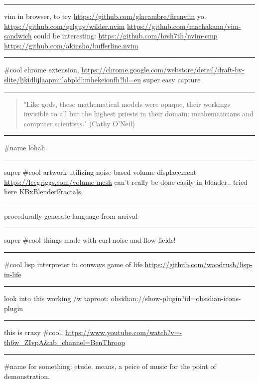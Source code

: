 \documentclass[letterpaper]{article}
\begin{document}
\noindent\rule{\textwidth}{0.5pt}

vim in browser, to try \url{https://github.com/glacambre/firenvim} yo.
\url{https://github.com/gelguy/wilder.nvim}
\url{https://github.com/machakann/vim-sandwich} could be interesting:
\url{https://github.com/hrsh7th/nvim-cmp}
\url{https://github.com/akinsho/bufferline.nvim}

\noindent\rule{\textwidth}{0.5pt}

\#cool chrome extension,
\url{https://chrome.google.com/webstore/detail/draft-by-slite/ljkidlijlaapmiilabpldhmhekeionfh?hl=en}
super easy capture

\noindent\rule{\textwidth}{0.5pt}

\begin{quote}
"Like gods, these mathematical models were opaque, their workings
invisible to all but the highest priests in their domain:
mathematicians and computer scientists." (Cathy O'Neil)
\end{quote}

\noindent\rule{\textwidth}{0.5pt}

\#name lohah

\noindent\rule{\textwidth}{0.5pt}

super \#cool artwork utilizing noise-based volume displacement
\url{https://leegriggs.com/volume-mesh} can't really be done easily in
blender.. tried here \href{KBxBlenderFractals.org}{KBxBlenderFractals}

\noindent\rule{\textwidth}{0.5pt}

procedurally generate language from arrival

\noindent\rule{\textwidth}{0.5pt}

super \#cool things made with curl noise and flow fields!

\noindent\rule{\textwidth}{0.5pt}

\#cool lisp interpreter in conways game of life
\url{https://github.com/woodrush/lisp-in-life}

\noindent\rule{\textwidth}{0.5pt}

look into this working /w taproot:
obsidian://show-plugin?id=obsidian-icons-plugin

\noindent\rule{\textwidth}{0.5pt}

this is crazy \#cool,
\url{https://www.youtube.com/watch?v=-th6w\_ZIvpA\&ab\_channel=BenThroop}

\noindent\rule{\textwidth}{0.5pt}

\#name for something: etude. means, a peice of music for the point of
demonstration.
\end{document}
